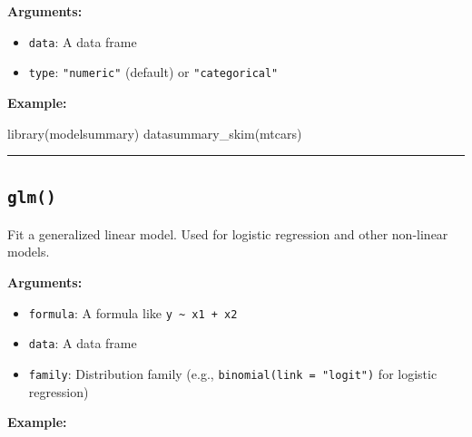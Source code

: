 \documentclass[
  letterpaper,
  DIV=11,
  numbers=noendperiod]{scrreprt}
\newenvironment{Shaded}{\begin{snugshade}}{\end{snugshade}}
\newcommand{\AttributeTok}[1]{\textcolor[rgb]{0.40,0.45,0.13}{#1}}
\newcommand{\DecValTok}[1]{\textcolor[rgb]{0.68,0.00,0.00}{#1}}
\newcommand{\FunctionTok}[1]{\textcolor[rgb]{0.28,0.35,0.67}{#1}}
\newcommand{\NormalTok}[1]{\textcolor[rgb]{0.00,0.23,0.31}{#1}}
\newcommand{\OtherTok}[1]{\textcolor[rgb]{0.00,0.23,0.31}{#1}}
\newcommand{\SpecialCharTok}[1]{\textcolor[rgb]{0.37,0.37,0.37}{#1}}
\newcommand{\StringTok}[1]{\textcolor[rgb]{0.13,0.47,0.30}{#1}}
\providecommand{\tightlist}{%
  \setlength{\itemsep}{0pt}\setlength{\parskip}{0pt}}
\begin{document}
\textbf{Arguments:}

\begin{itemize}
\tightlist
\item
  \texttt{data}: A data frame
\item
  \texttt{type}: \texttt{"numeric"} (default) or \texttt{"categorical"}
\end{itemize}

\textbf{Example:}

\begin{Shaded}
\begin{Highlighting}[]
\FunctionTok{library}\NormalTok{(modelsummary)}
\FunctionTok{datasummary\_skim}\NormalTok{(mtcars)}
\end{Highlighting}
\end{Shaded}

\begin{center}\rule{0.5\linewidth}{0.5pt}\end{center}

\subsection{\texorpdfstring{\texttt{glm()}}{glm()}}\label{glm}

Fit a generalized linear model. Used for logistic regression and other
non-linear models.

\textbf{Arguments:}

\begin{itemize}
\tightlist
\item
  \texttt{formula}: A formula like
  \texttt{y\ \textasciitilde{}\ x1\ +\ x2}
\item
  \texttt{data}: A data frame
\item
  \texttt{family}: Distribution family (e.g.,
  \texttt{binomial(link\ =\ "logit")} for logistic regression)
\end{itemize}

\textbf{Example:}

\begin{Shaded}
\end{Shaded}
\end{document}
